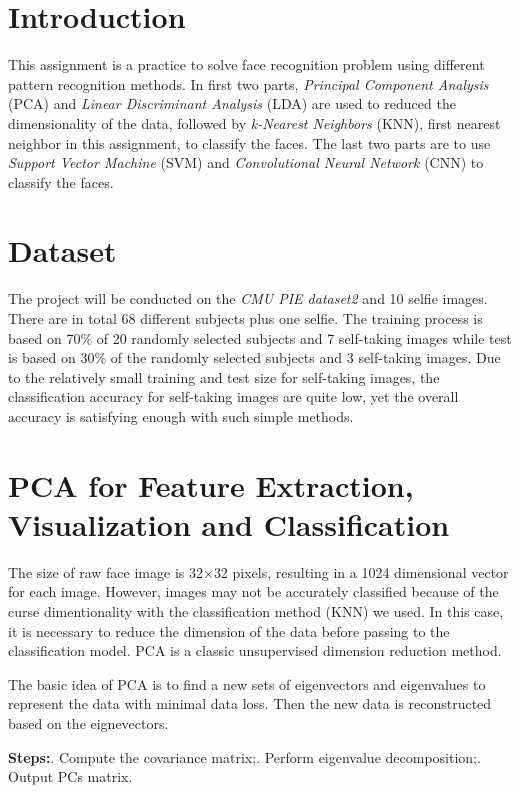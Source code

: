 \section*{Introduction}
\noindent This assignment is a practice to solve face recognition problem using different pattern recognition methods. In first two parts, \textit{Principal Component Analysis} (PCA) and \textit{Linear Discriminant Analysis} (LDA) are used to reduced the dimensionality of the data, followed by \textit{k-Nearest Neighbors} (KNN), first nearest neighbor in this assignment, to classify the faces. The last two parts are to use \textit{Support Vector Machine} (SVM) and \textit{Convolutional Neural Network} (CNN) to classify the faces.

\section*{Dataset}
\noindent The project will be conducted on the \textit{CMU PIE dataset2} and 10 selfie images. There are in total 68 different subjects plus one selfie. The training process is based on 70\% of 20 randomly selected subjects and 7 self-taking images while test is based on 30\% of the randomly selected subjects and 3 self-taking images. Due to the relatively small training and test size for self-taking images, the classification accuracy for self-taking images are quite low, yet the overall accuracy is satisfying enough with such simple methods.

\section*{PCA for Feature Extraction, Visualization and Classification}
\noindent The size of raw face image is 32$\times$32 pixels, resulting in a 1024 dimensional vector for each image. However, images may not be accurately classified because of the curse dimentionality with the classification method (KNN) we used. In this case, it is necessary to reduce the dimension of the data before passing to the classification model. PCA is a classic unsupervised dimension reduction method. 

The basic idea of PCA is to find a new sets of eigenvectors and eigenvalues to represent the data with minimal data loss. Then the new data is reconstructed based on the eignevectors.

\vspace{5mm}
\noindent \textbf{Steps:}\hfill {}. Compute the covariance matrix;\hfill {}. Perform eigenvalue decomposition;\hfill {}. Output PCs matrix.\hfill \break
\vspace{5mm}

